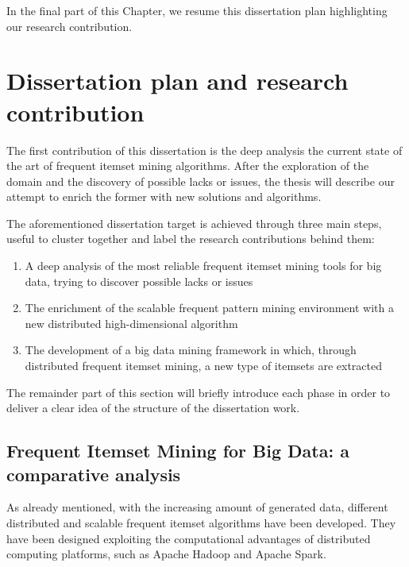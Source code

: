 In the final part of this Chapter, we resume this dissertation plan highlighting our research contribution.

\section{Dissertation plan and research contribution}
The first contribution of this dissertation is the deep analysis the current state of the art of frequent itemset mining algorithms. After the exploration of the domain and the discovery of possible lacks or issues, the thesis will describe our attempt to enrich the former with new solutions and algorithms. 

The aforementioned dissertation target is achieved through three main steps, useful to cluster together and label the research contributions behind them:

\begin{enumerate}
\item A deep analysis of the most reliable frequent itemset mining tools for big data, trying to discover possible lacks or issues
\item The enrichment of the scalable frequent pattern mining environment with a new distributed high-dimensional algorithm 
\item The development of a big data mining framework in which, through distributed frequent itemset mining, a new type of itemsets are extracted
\end{enumerate}
The remainder part of this section will briefly introduce each phase in order to deliver a clear idea of the structure of the dissertation work.




\subsection{Frequent Itemset Mining for Big Data: a comparative analysis}
As already mentioned, with the increasing amount of generated data, different distributed and scalable frequent itemset algorithms
have been developed. They have been designed exploiting the computational advantages of distributed
computing platforms, such as Apache Hadoop and Apache Spark.

